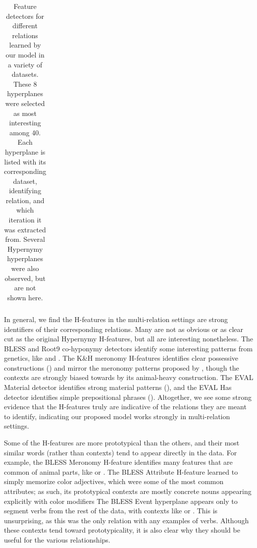 \begin{table}[t]
\begin{small}
\begin{tabular}{|ll|}
\hline
\end{tabular}
\end{small}
\caption{Feature detectors for different relations learned by our model in a
  variety of datasets. These 8 hyperplanes were selected as most interesting
  among 40. Each hyperplane is listed with its corresponding dataset,
  identifying relation, and which iteration it was extracted from. Several
  Hypernymy hyperplanes were also observed, but are not shown here.}
\label{tab:ctxsimmulti}
\end{table}

In general, we find the H-features in the multi-relation settings are strong
identifiers of their corresponding relations. Many are not as obvious or as
clear cut as the original Hypernymy H-features, but all are interesting
nonetheless. The BLESS and Root9 co-hyponymy detectors identify some
interesting patterns from genetics, like  and . The K\&H meronomy H-features
identifies clear possessive constructions () and mirror
the meronomy patterns proposed by , though
the contexts are strongly biased towards by its animal-heavy construction.
The EVAL Material detector identifies strong material patterns
(), and the EVAL Has detector
identifies simple prepositional phrases ().
Altogether, we see some strong evidence that the H-features truly are
indicative of the relations they are meant to identify, indicating our
proposed model works strongly in multi-relation settings.

Some of the H-features are more prototypical than the others, and their
most similar words (rather than contexts) tend to appear directly in the data.
For example, the BLESS Meronomy H-feature identifies many features that are
common of animal parts, like  or .
The BLESS Attribute H-feature learned to simply memorize color adjectives, which
were some of the most common attributes; as such, its prototypical contexts are
mostly concrete nouns appearing explicitly with color modifiers
The BLESS
Event hyperplane appears only to segment verbs from the rest of the data,
with contexts like  or . This is
unsurprising, as this was the only relation with any examples of verbs.
Although these contexts tend toward prototypicality, it is also clear why
they should be useful for the various relationships.

